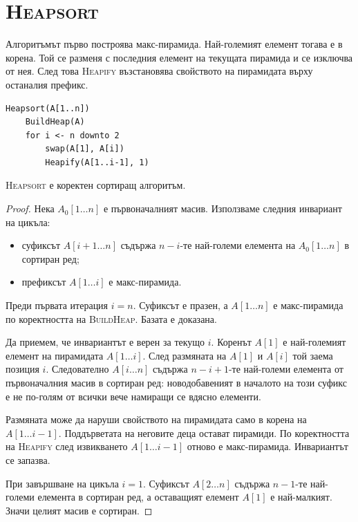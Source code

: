 \section{\textsc{Heapsort}}\label{s:6.5}

Алгоритъмът първо построява макс-пирамида. Най-големият елемент тогава е в корена. Той се разменя с последния елемент на текущата пирамида и се изключва от нея. След това \textsc{Heapify} възстановява свойството на пирамидата върху останалия префикс.

\begin{verbatim}
Heapsort(A[1..n])
    BuildHeap(A)
    for i <- n downto 2
        swap(A[1], A[i])
        Heapify(A[1..i-1], 1)
\end{verbatim}

\begin{thm}
\textsc{Heapsort} е коректен сортиращ алгоритъм.
\end{thm}

\begin{proof}
Нека $A_0[1\ldots n]$ е първоначалният масив. Използваме следния инвариант на цикъла:

\begin{itemize}
    \item суфиксът $A[i+1\ldots n]$ съдържа $n-i$-те най-големи елемента на $A_0[1\ldots n]$ в сортиран ред;
    \item префиксът $A[1\ldots i]$ е макс-пирамида.
\end{itemize}

Преди първата итерация $i=n$. Суфиксът е празен, а $A[1\ldots n]$ е макс-пирамида по коректността на \textsc{BuildHeap}. Базата е доказана.

Да приемем, че инвариантът е верен за текущо $i$. Коренът $A[1]$ е най-големият елемент на пирамидата $A[1\ldots i]$. След размяната на $A[1]$ и $A[i]$ той заема позиция $i$. Следователно $A[i\ldots n]$ съдържа $n-i+1$-те най-големи елемента от първоначалния масив в сортиран ред: новодобавеният в началото на този суфикс е не по-голям от всички вече намиращи се вдясно елементи.

Размяната може да наруши свойството на пирамидата само в корена на $A[1\ldots i-1]$. Поддърветата на неговите деца остават пирамиди. По коректността на \textsc{Heapify} след извикването $A[1\ldots i-1]$ отново е макс-пирамида. Инвариантът се запазва.

При завършване на цикъла $i=1$. Суфиксът $A[2\ldots n]$ съдържа $n-1$-те най-големи елемента в сортиран ред, а оставащият елемент $A[1]$ е най-малкият. Значи целият масив е сортиран.
\end{proof}

